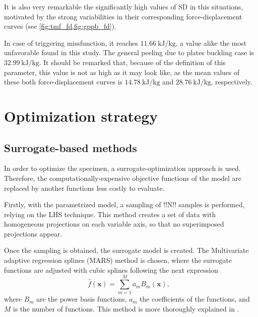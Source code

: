 \documentclass[cmfonts]{witpress}
\begin{document}
It is also very remarkable the significantly high values of SD in this situations, motivated by the strong variabilities in their corresponding force-displacement curves (see \cref{fig:tmf_fd,fig:gppb_fd}).

In case of triggering missfunction, it reaches $\SI{11.66}{\kJ/\kg}$, a value alike the most unfavorable found in this study. The general peeling due to plates buckling case is $\SI{32.99}{\kJ/\kg}$. It should be remarked that, because of the definition of this parameter, this value is not as high as it may look like, as the mean values of these both force-displacement curves is $\SI{14.78}{\kJ/\kg}$ and $\SI{28.76}{\kJ/\kg}$, respectively.

\section{Optimization strategy}

\subsection{Surrogate-based methods}

In order to optimize the specimen, a surrogate-optimization approach is used. Therefore, the computationally-expensive  objective functions of the model are replaced by another functions less costly to evaluate. 

Firstly, with the parametrized model, a sampling of !!N!! samples is performed, relying on the LHS technique. This method creates a set of data with homogeneous projections on each variable axis, so that no superimposed projections appear. 

Once the sampling is obtained, the surrogate model is created. The Multivariate adaptive regression splines (MARS) method is chosen, where the surrogate functions are adjusted with cubic splines following the next expression
\begin{equation}\label{eq:mars}
\hat{f}\left ( \bm{x} \right )= \sum_{m=1}^{M}a_{m}B_{m}\left ( \bm{x} \right ),
\end{equation}
where $B_{m}$ are the power basis functions, $a_{m}$ the coefficients of the functions, and $M$ is the number of functions. This method is more thoroughly explained in \cite{Friedman1995197}. 

\end{document}
